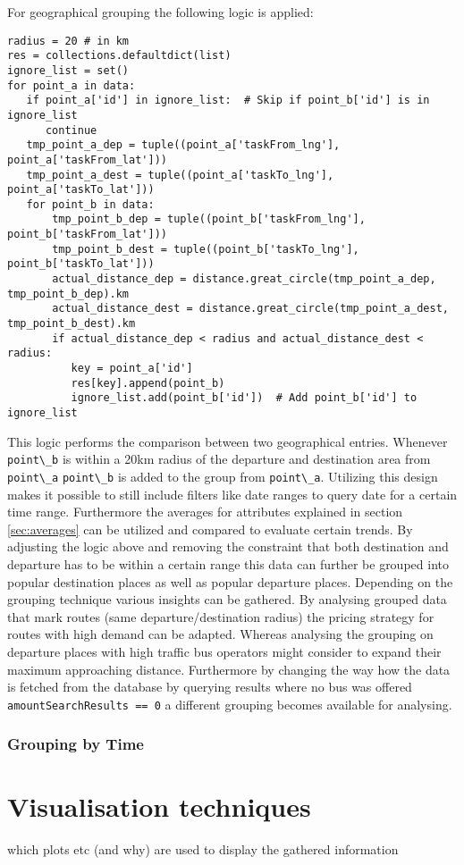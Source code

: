 For geographical grouping the following logic is applied:
\begin{lstlisting}
radius = 20 # in km
res = collections.defaultdict(list)
ignore_list = set()
for point_a in data:
   if point_a['id'] in ignore_list:  # Skip if point_b['id'] is in ignore_list
      continue
   tmp_point_a_dep = tuple((point_a['taskFrom_lng'], point_a['taskFrom_lat']))
   tmp_point_a_dest = tuple((point_a['taskTo_lng'], point_a['taskTo_lat']))
   for point_b in data:
	   tmp_point_b_dep = tuple((point_b['taskFrom_lng'], point_b['taskFrom_lat']))
       tmp_point_b_dest = tuple((point_b['taskTo_lng'], point_b['taskTo_lat']))
       actual_distance_dep = distance.great_circle(tmp_point_a_dep, tmp_point_b_dep).km
       actual_distance_dest = distance.great_circle(tmp_point_a_dest, tmp_point_b_dest).km
       if actual_distance_dep < radius and actual_distance_dest < radius:
          key = point_a['id']
          res[key].append(point_b)
          ignore_list.add(point_b['id'])  # Add point_b['id'] to ignore_list
\end{lstlisting}
This logic performs the comparison between two geographical entries. Whenever \verb|point\_b| is within a 20km radius of the departure and destination area from \verb|point\_a| \verb|point\_b| is added to the group from \verb|point\_a|. Utilizing this design makes it possible to still include filters like date ranges to query date for a certain time range. Furthermore the averages for attributes explained in section \ref{sec:averages} can be utilized and compared to evaluate certain trends. By adjusting the logic above and removing the constraint that both destination and departure has to be within a certain range this data can further be grouped into popular destination places as well as popular departure places. Depending on the grouping technique various insights can be gathered. By analysing grouped data that mark routes (same departure/destination radius) the pricing strategy for routes with high demand can be adapted. Whereas analysing the grouping on departure places with high traffic bus operators might consider to expand their maximum approaching distance. Furthermore by changing the way how the data is fetched from the database by querying results where no bus was offered \verb|amountSearchResults == 0| a different grouping becomes available for analysing. 

\subsubsection{Grouping by Time}






\section{Visualisation techniques}
which plots etc (and why) are used to display the gathered information 

